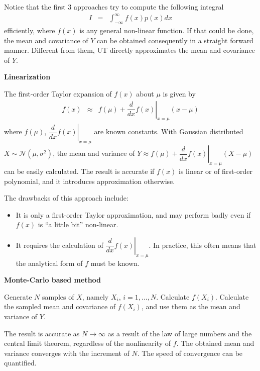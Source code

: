 Notice that the first 3 approaches try to compute the following integral
\begin{eqnarray}
	I &=& \int_{-\infty}^{\infty} f(x)p(x)dx \label{eq:ut1}
\end{eqnarray}
efficiently, where $f(x)$ is any general non-linear function. If that could be done, the mean and covariance of $Y$ can be obtained consequently in a straight forward manner. Different from them, UT directly approximates the mean and covariance of $Y$.

\vspace{0.1in}
\noindent \textbf{Linearization}
\vspace{0.1in}

The first-order Taylor expansion of $f(x)$ about $\mu$ is given by
\begin{eqnarray}
	f(x) &\approx& f(\mu) + \left.\dfrac{d}{dx}f(x)\right|_{x=\mu}(x-\mu)
\end{eqnarray}
where $f(\mu)$, $ \left.\dfrac{d}{dx}f(x)\right|_{x=\mu}$ are known constants. With Gaussian distributed $X\sim\mathcal{N}(\mu, \sigma^2)$, the mean and variance of $Y\approx f(\mu) + \left.\dfrac{d}{dx}f(x)\right|_{x=\mu}(X-\mu)$ can be easily calculated. The result is accurate if $f(x)$ is linear or of first-order polynomial, and it introduces approximation otherwise.

The drawbacks of this approach include:
\begin{itemize}
	\item It is only a first-order Taylor approximation, and may perform badly even if $f(x)$ is ``a little bit'' non-linear.
	\item It requires the calculation of $\left.\dfrac{d}{dx}f(x)\right|_{x=\mu}$. In practice, this often means that the analytical form of $f$ must be known.
\end{itemize}

\vspace{0.1in}
\noindent \textbf{Monte-Carlo based method}
\vspace{0.1in}

Generate $N$ samples of $X$, namely $X_i$, $i=1,...,N$. Calculate $f(X_i)$. Calculate the sampled mean and covariance of $f(X_i)$, and use them as the mean and variance of $Y$.

The result is accurate as $N\rightarrow\infty$ as a result of the law of large numbers and the central limit theorem, regardless of the nonlinearity of $f$. The obtained mean and variance converges with the increment of $N$. The speed of convergence can be quantified.

